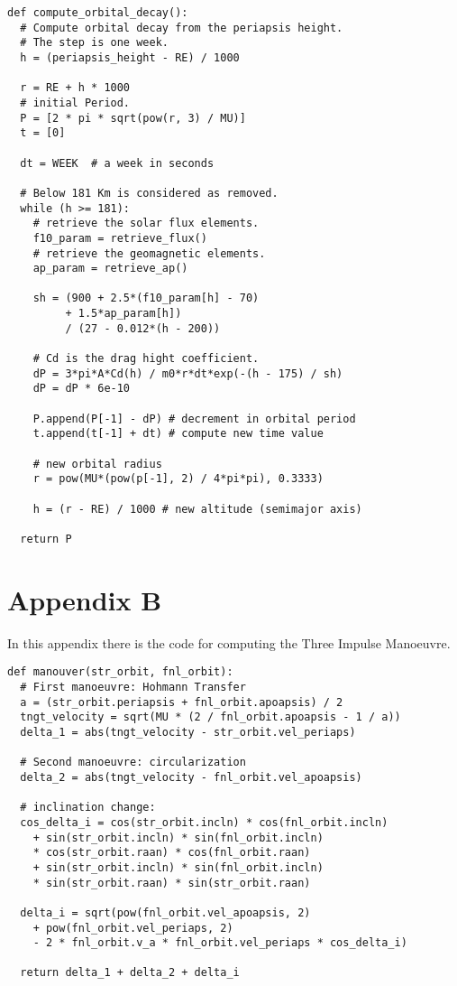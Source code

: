 \documentclass[a4paper,9pt,journal,twoside,compsoc]{PPIEEEtran}
\begin{document}
\begin{lstlisting}[basicstyle=\scriptsize \ttfamily]
def compute_orbital_decay():
  # Compute orbital decay from the periapsis height.
  # The step is one week.
  h = (periapsis_height - RE) / 1000

  r = RE + h * 1000
  # initial Period.
  P = [2 * pi * sqrt(pow(r, 3) / MU)]
  t = [0]

  dt = WEEK  # a week in seconds

  # Below 181 Km is considered as removed.
  while (h >= 181):
    # retrieve the solar flux elements.
    f10_param = retrieve_flux()
    # retrieve the geomagnetic elements.
    ap_param = retrieve_ap()

    sh = (900 + 2.5*(f10_param[h] - 70)
         + 1.5*ap_param[h]) 
         / (27 - 0.012*(h - 200))
            
    # Cd is the drag hight coefficient.
    dP = 3*pi*A*Cd(h) / m0*r*dt*exp(-(h - 175) / sh)
    dP = dP * 6e-10
   
    P.append(P[-1] - dP) # decrement in orbital period
    t.append(t[-1] + dt) # compute new time value
    
    # new orbital radius
    r = pow(MU*(pow(p[-1], 2) / 4*pi*pi), 0.3333) 

    h = (r - RE) / 1000 # new altitude (semimajor axis)

  return P
\end{lstlisting}

\section{Appendix B}
In this appendix there is the code for computing the Three Impulse Manoeuvre.

\begin{lstlisting}[basicstyle=\scriptsize \ttfamily]
def manouver(str_orbit, fnl_orbit):
  # First manoeuvre: Hohmann Transfer
  a = (str_orbit.periapsis + fnl_orbit.apoapsis) / 2
  tngt_velocity = sqrt(MU * (2 / fnl_orbit.apoapsis - 1 / a))
  delta_1 = abs(tngt_velocity - str_orbit.vel_periaps)

  # Second manoeuvre: circularization
  delta_2 = abs(tngt_velocity - fnl_orbit.vel_apoapsis)
 
  # inclination change:
  cos_delta_i = cos(str_orbit.incln) * cos(fnl_orbit.incln)
    + sin(str_orbit.incln) * sin(fnl_orbit.incln) 
    * cos(str_orbit.raan) * cos(fnl_orbit.raan)
    + sin(str_orbit.incln) * sin(fnl_orbit.incln)
    * sin(str_orbit.raan) * sin(str_orbit.raan)
    
  delta_i = sqrt(pow(fnl_orbit.vel_apoapsis, 2) 
    + pow(fnl_orbit.vel_periaps, 2)
    - 2 * fnl_orbit.v_a * fnl_orbit.vel_periaps * cos_delta_i)
  
  return delta_1 + delta_2 + delta_i
\end{lstlisting}
\end{document}
